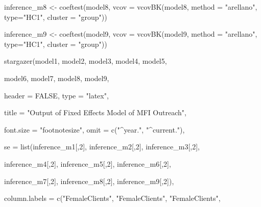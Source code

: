 \documentclass[a4paper,nobind]{templates/ociamthesis}
\newenvironment{Shaded}{\begin{snugshade}}{\end{snugshade}}
\newcommand{\AttributeTok}[1]{\textcolor[rgb]{0.77,0.63,0.00}{#1}}
\newcommand{\ConstantTok}[1]{\textcolor[rgb]{0.00,0.00,0.00}{#1}}
\newcommand{\DecValTok}[1]{\textcolor[rgb]{0.00,0.00,0.81}{#1}}
\newcommand{\FunctionTok}[1]{\textcolor[rgb]{0.00,0.00,0.00}{#1}}
\newcommand{\NormalTok}[1]{#1}
\newcommand{\OtherTok}[1]{\textcolor[rgb]{0.56,0.35,0.01}{#1}}
\newcommand{\StringTok}[1]{\textcolor[rgb]{0.31,0.60,0.02}{#1}}
\renewenvironment{Shaded}
{
  \vspace{10pt}%
  \begin{snugshade}%
}{%
  \end{snugshade}%
  \vspace{8pt}%
}
\begin{document}
\begin{Shaded}
\begin{Highlighting}[]
\NormalTok{inference\_m8 }\OtherTok{\textless{}{-}} \FunctionTok{coeftest}\NormalTok{(model8, }\AttributeTok{vcov =} \FunctionTok{vcovBK}\NormalTok{(model8, }\AttributeTok{method =} \StringTok{"arellano"}\NormalTok{, }\AttributeTok{type=}\StringTok{"HC1"}\NormalTok{, }\AttributeTok{cluster =} \StringTok{"group"}\NormalTok{))}

\NormalTok{inference\_m9 }\OtherTok{\textless{}{-}} \FunctionTok{coeftest}\NormalTok{(model9, }\AttributeTok{vcov =} \FunctionTok{vcovBK}\NormalTok{(model9, }\AttributeTok{method =} \StringTok{"arellano"}\NormalTok{, }\AttributeTok{type=}\StringTok{"HC1"}\NormalTok{, }\AttributeTok{cluster =} \StringTok{"group"}\NormalTok{))}
\end{Highlighting}
\end{Shaded}

\begin{landscape}

\begin{Shaded}
\begin{Highlighting}[]
\FunctionTok{stargazer}\NormalTok{(model1, model2, model3, model4, model5, }
          
\NormalTok{          model6, model7, model8, model9, }
          
          \AttributeTok{header =} \ConstantTok{FALSE}\NormalTok{, }\AttributeTok{type =} \StringTok{"latex"}\NormalTok{,}
          
          \AttributeTok{title =} \StringTok{"Output of Fixed Effects Model of MFI Outreach"}\NormalTok{, }
          
\AttributeTok{font.size =} \StringTok{"footnotesize"}\NormalTok{, }\AttributeTok{omit =} \FunctionTok{c}\NormalTok{(}\StringTok{"\^{}year."}\NormalTok{, }\StringTok{"\^{}current."}\NormalTok{),}

\AttributeTok{se =} \FunctionTok{list}\NormalTok{(inference\_m1[,}\DecValTok{2}\NormalTok{], inference\_m2[,}\DecValTok{2}\NormalTok{], inference\_m3[,}\DecValTok{2}\NormalTok{], }
          
\NormalTok{          inference\_m4[,}\DecValTok{2}\NormalTok{], inference\_m5[,}\DecValTok{2}\NormalTok{], inference\_m6[,}\DecValTok{2}\NormalTok{],}
          
\NormalTok{          inference\_m7[,}\DecValTok{2}\NormalTok{], inference\_m8[,}\DecValTok{2}\NormalTok{], inference\_m9[,}\DecValTok{2}\NormalTok{]),}

\AttributeTok{column.labels =} \FunctionTok{c}\NormalTok{(}\StringTok{"FemaleClients"}\NormalTok{, }\StringTok{"FemaleClients"}\NormalTok{, }\StringTok{"FemaleClients"}\NormalTok{, }
                  

\end{Highlighting}
\end{Shaded}
\end{landscape}
\end{document}
